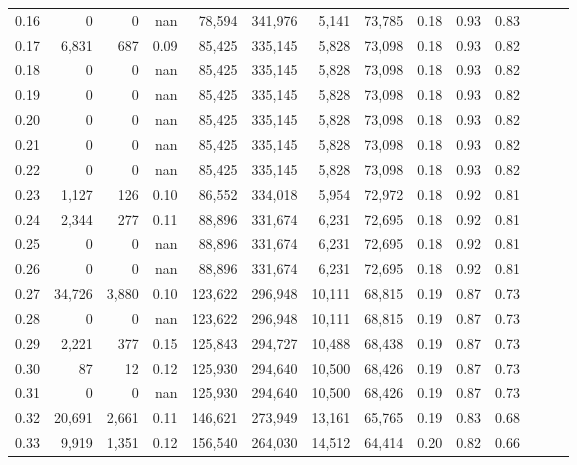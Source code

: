 \begin{tabular}{rrrrrrrrrrrrrr}
0.16 &       0 &      0 &   nan &   78,594 &  341,976 &   5,141 &  73,785 &  0.18 &  0.93 &      0.83 \\
0.17 &   6,831 &    687 &  0.09 &   85,425 &  335,145 &   5,828 &  73,098 &  0.18 &  0.93 &      0.82 \\
0.18 &       0 &      0 &   nan &   85,425 &  335,145 &   5,828 &  73,098 &  0.18 &  0.93 &      0.82 \\
0.19 &       0 &      0 &   nan &   85,425 &  335,145 &   5,828 &  73,098 &  0.18 &  0.93 &      0.82 \\
0.20 &       0 &      0 &   nan &   85,425 &  335,145 &   5,828 &  73,098 &  0.18 &  0.93 &      0.82 \\
0.21 &       0 &      0 &   nan &   85,425 &  335,145 &   5,828 &  73,098 &  0.18 &  0.93 &      0.82 \\
0.22 &       0 &      0 &   nan &   85,425 &  335,145 &   5,828 &  73,098 &  0.18 &  0.93 &      0.82 \\
0.23 &   1,127 &    126 &  0.10 &   86,552 &  334,018 &   5,954 &  72,972 &  0.18 &  0.92 &      0.81 \\
0.24 &   2,344 &    277 &  0.11 &   88,896 &  331,674 &   6,231 &  72,695 &  0.18 &  0.92 &      0.81 \\
0.25 &       0 &      0 &   nan &   88,896 &  331,674 &   6,231 &  72,695 &  0.18 &  0.92 &      0.81 \\
0.26 &       0 &      0 &   nan &   88,896 &  331,674 &   6,231 &  72,695 &  0.18 &  0.92 &      0.81 \\
0.27 &  34,726 &  3,880 &  0.10 &  123,622 &  296,948 &  10,111 &  68,815 &  0.19 &  0.87 &      0.73 \\
0.28 &       0 &      0 &   nan &  123,622 &  296,948 &  10,111 &  68,815 &  0.19 &  0.87 &      0.73 \\
0.29 &   2,221 &    377 &  0.15 &  125,843 &  294,727 &  10,488 &  68,438 &  0.19 &  0.87 &      0.73 \\
0.30 &      87 &     12 &  0.12 &  125,930 &  294,640 &  10,500 &  68,426 &  0.19 &  0.87 &      0.73 \\
0.31 &       0 &      0 &   nan &  125,930 &  294,640 &  10,500 &  68,426 &  0.19 &  0.87 &      0.73 \\
0.32 &  20,691 &  2,661 &  0.11 &  146,621 &  273,949 &  13,161 &  65,765 &  0.19 &  0.83 &      0.68 \\
0.33 &   9,919 &  1,351 &  0.12 &  156,540 &  264,030 &  14,512 &  64,414 &  0.20 &  0.82 &      0.66 \\

\end{tabular}

